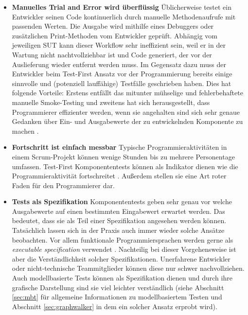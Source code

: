\begin{itemize}
\item \textbf{Manuelles Trial and Error wird überflüssig} Üblicherweise testet ein Entwickler seinen Code kontinuerlich durch manuelle Methodenaufrufe mit passenden Werten. Die Ausgabe wird mithilfe eines Debuggers oder zusätzlichen Print-Methoden vom Entwickler geprüft. Abhängig vom jeweiligen \Gls{SUT} kann dieser Workflow sehr ineffizient sein, weil er in der Wartung nicht nachtvollziehbar ist und Code generiert, der vor der Auslieferung wieder entfernt werden muss. Im Gegensatz dazu muss der Entwickler beim Test-First Ansatz vor der Programmierung bereits einige sinnvolle und (potenziell lauffähige) Testfälle geschrieben haben. Dies hat folgende Vorteile: Erstens entfällt das mitunter mühselige und fehlerbehaftete manuelle \Gls{Smoke-Testing} und zweitens hat sich herausgestellt, dass Programmierer effizienter werden, wenn sie angehalten sind sich sehr genaue Gedanken über Ein- und Ausgabewerte der zu entwickelnden Komponente zu machen \cite{erdogmus_effectiveness_2005}.
\item \textbf{Fortschritt ist einfach messbar} Typische Programmieraktivitäten in einem Scrum-Projekt können wenige Stunden bis zu mehrere Personentage umfassen. Test-First Komponententests können als Indikator dienen wie die Programmieraktivität fortschreitet \cite{linz_testing_2014}. Außerdem stellen sie eine Art roter Faden für den Programmierer dar.
\item \textbf{Tests als Spezifikation} Komponententests geben sehr genau vor welche Ausgabewerte auf einen bestimmten Eingabewert erwartet werden. Das bedeutet, dass sie als Teil einer Spezifikation angesehen werden können. Tatsächlich lassen sich in der Praxis auch immer wieder solche Ansätze beobachten. Vor allem funktionale Programmiersprachen werden gerne als \textit{executable specification} verwendet \cite{klein_sel4:_2010}. Nachteilig bei dieser Vorgehensweise ist aber die Verständlichkeit solcher Spezifikationen. Unerfahrene Entwickler oder nicht-technische Teammitglieder können diese nur schwer nachvollziehen. Auch modellbasierte Tests können als Spezifikation dienen und durch ihre grafische Darstellung sind sie viel leichter verständlich (siehe Abschnitt \ref{sec:mbt} für allgemeine Informationen zu modellbasiertem Testen und Abschnitt \ref{sec:graphwalker} in dem ein solcher Ansatz erprobt wird).
\end{itemize}


